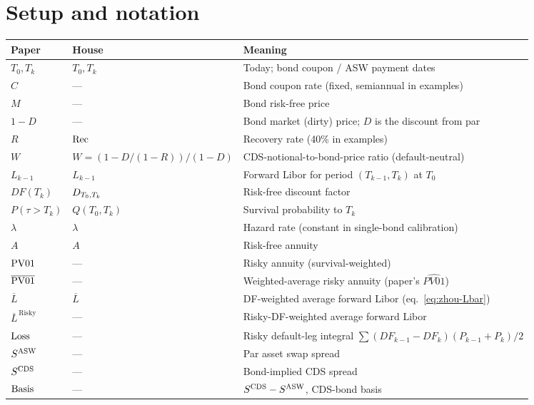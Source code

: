 \documentclass[11pt,a4paper]{article}
\begin{document}
\section{Setup and notation}

\begin{tabular}{@{}p{3cm}p{3.5cm}p{8.5cm}@{}}
\toprule
Paper             & House                       & Meaning \\
\midrule
$T_0, T_k$        & $T_0, T_k$                  & Today; bond coupon / ASW payment dates \\
$C$               & ---                         & Bond coupon rate (fixed, semiannual in examples) \\
$M$               & ---                         & Bond risk-free price \\
$1 - D$           & ---                         & Bond market (dirty) price; $D$ is the discount from par \\
$R$               & $\mathrm{Rec}$                      & Recovery rate (40\% in examples) \\
$W$               & $W = (1 - D/(1-R))/(1-D)$   & CDS-notional-to-bond-price ratio (default-neutral) \\
$L_{k-1}$         & $L_{k-1}$                   & Forward Libor for period $(T_{k-1}, T_k)$ at $T_0$ \\
$DF(T_k)$         & $D_{T_0,T_k}$           & Risk-free discount factor \\
$P(\tau > T_k)$   & $Q(T_0, T_k)$               & Survival probability to $T_k$ \\
$\lambda$         & $\lambda$                   & Hazard rate (constant in single-bond calibration) \\
$A$               & $A$                         & Risk-free annuity \\
$\mathrm{PV01}$          & ---                         & Risky annuity (survival-weighted) \\
$\overline{\mathrm{PV01}}$ & ---                       & Weighted-average risky annuity (paper's $\widehat{PV01}$) \\
$\overline L$     & $\overline L$               & DF-weighted average forward Libor (eq.~\ref{eq:zhou-Lbar}) \\
$\overline L^{\,\text{Risky}}$ & ---            & Risky-DF-weighted average forward Libor \\
$\mathrm{Loss}$           & ---                         & Risky default-leg integral $\sum (DF_{k-1} - DF_k)(P_{k-1} + P_k)/2$ \\
$S^{\mathrm{ASW}}$           & ---                         & Par asset swap spread \\
$S^{\mathrm{CDS}}$           & ---                         & Bond-implied CDS spread \\
$\mathrm{Basis}$          & ---                         & $S^{\mathrm{CDS}} - S^{\mathrm{ASW}}$, CDS-bond basis \\
\bottomrule
\end{tabular}
\end{document}
